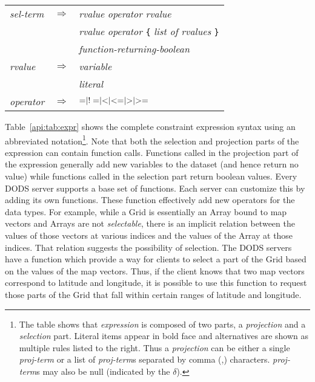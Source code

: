 \documentclass[12pt]{article}
\begin{document}
\begin{table}
\begin{center}
\begin{tabular}{lll}
\emph{sel-term}   & $\Rightarrow$ & \emph{rvalue} \emph{operator} \emph{rvalue} \\
                  &             & \emph{rvalue} \emph{operator} {\tt \{} 
                                         \emph{list of rvalues} {\tt \}} \\
                  &             & \emph{function-returning-boolean} \\

\emph{rvalue}     & $\Rightarrow$ & \emph{variable} \\
                  &             & \emph{literal} \\

\emph{operator}   & $\Rightarrow$ & ${\tt =} | {\tt !=} | {\tt <} | {\tt <=}
                                     | {\tt >} | {\tt >=}$ \\
\end{tabular}
\end{center}
\end{table}

Table~\ref{api:tab:expr} shows the complete constraint expression syntax
using an abbreviated notation\footnote{The table shows that
\emph{expression} is composed of two parts, a \emph{projection} and a
\emph{selection} part. Literal items appear in bold face and
alternatives are shown as multiple rules listed to the right. Thus
a \emph{projection} can be either a single \emph{proj-term} or a list of
\emph{proj-term}s separated by comma (,) characters. 
\emph{proj-term}s may also be null (indicated by the $\delta$).}. 
Note that both the selection and projection
parts of the expression can contain function calls. Functions called in the
projection part of the expression generally add new variables to the dataset
(and hence return no value) while functions called in the selection part
return boolean values. Every \ac{DODS} server supports a base set of
functions.  Each server can customize this by adding its own functions. These
function effectively add new operators for the data types. For example, while
a Grid is essentially an Array bound to map vectors and Arrays are not
\emph{selectable}, there is an implicit relation between the values of those
vectors at various indices and the values of the Array at those indices. That
relation suggests the possibility of selection. The \ac{DODS} servers have a
function which provide a way for clients to select a part of the Grid based
on the values of the map vectors.  Thus, if the client knows that two map
vectors correspond to latitude and longitude, it is possible to use this
function to request those parts of the Grid that fall within certain ranges
of latitude and longitude.
\end{document}
